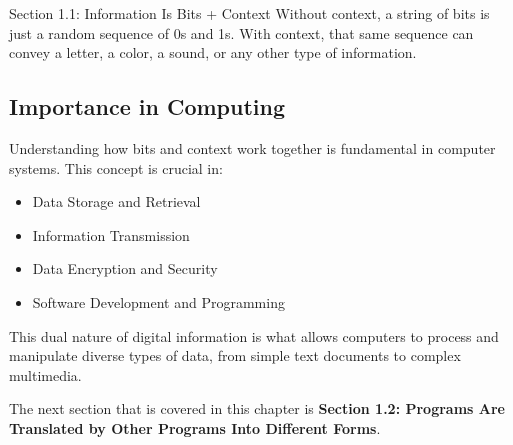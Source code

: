 \begin{notes}{Section 1.1: Information Is Bits + Context}
    Without context, a string of bits is just a random sequence of 0s and 1s. With context, that same sequence can convey a letter, a color, a sound, or any other type of information.
    
    \subsection*{Importance in Computing}

    Understanding how bits and context work together is fundamental in computer systems. This concept is crucial in:

    \begin{itemize}
        \item Data Storage and Retrieval
        \item Information Transmission
        \item Data Encryption and Security
        \item Software Development and Programming
    \end{itemize}

    This dual nature of digital information is what allows computers to process and manipulate diverse types of data, from simple text documents to complex multimedia.
\end{notes}

The next section that is covered in this chapter is \textbf{Section 1.2: Programs Are Translated by Other Programs Into Different Forms}.


